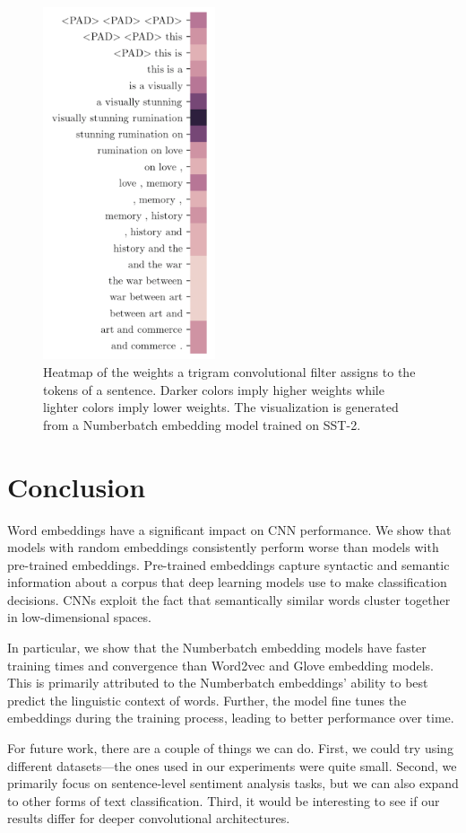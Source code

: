 \documentclass{article}
\begin{document}
\begin{figure}
  \centering
  \includegraphics[width=2in]{filter.png}
  \caption{Heatmap of the weights a trigram convolutional filter assigns to the tokens of a sentence. Darker colors imply higher weights while lighter colors imply lower weights. The visualization is generated from a Numberbatch embedding model trained on SST-2.}
  \label{fig:filter}
\end{figure}

\section{Conclusion}
Word embeddings have a significant impact on CNN performance. We show that models with random embeddings consistently perform worse than models with pre-trained embeddings. Pre-trained embeddings capture syntactic and semantic information about a corpus that deep learning models use to make classification decisions. CNNs exploit the fact that semantically similar words cluster together in low-dimensional spaces. 

In particular, we show that the Numberbatch embedding models have faster training times and convergence than Word2vec and Glove embedding models. This is primarily attributed to the Numberbatch embeddings' ability to best predict the linguistic context of words. Further, the model fine tunes the embeddings during the training process, leading to better performance over time.

For future work, there are a couple of things we can do. First, we could try using different datasets---the ones used in our experiments were quite small. Second, we primarily focus on sentence-level sentiment analysis tasks, but we can also expand to other forms of text classification. Third, it would be interesting to see if our results differ for deeper convolutional architectures.

{\small


}
\end{document}
